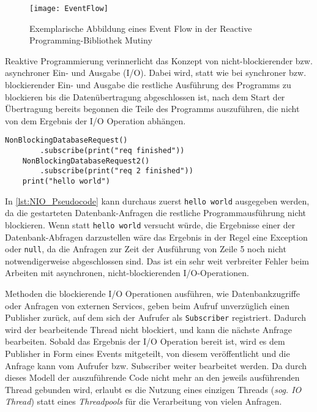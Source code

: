 \begin{figure}[h!]
	\centering
	\texttt{[image: EventFlow]}
	\caption{Exemplarische Abbildung eines Event Flow in der Reactive Programming-Bibliothek Mutiny \parencite{MutinyEventFlow}}
	\label{fig:eventflow_mutiny}
\end{figure}

Reaktive Programmierung verinnerlicht das Konzept von nicht-blockierender bzw. asynchroner Ein- und Ausgabe (I/O).
Dabei wird, statt wie bei synchroner bzw. blockierender Ein- und Ausgabe die restliche Ausführung des Programms
zu blockieren bis die Datenübertragung abgeschlossen ist, nach dem Start der Übertragung bereits begonnen die Teile des
Programms auszuführen, die nicht von dem Ergebnis der I/O Operation abhängen.

\begin{lstlisting}[caption=Pseudocode Nonblocking I/O (NIO), captionpos=b, label=lst:NIO_Pseudocode]
	NonBlockingDatabaseRequest()
		.subscribe(print("req finished"))
	NonBlockingDatabaseRequest2()
		.subscribe(print("req 2 finished"))
	print("hello world")
\end{lstlisting}
In \ref{lst:NIO_Pseudocode} kann durchaus zuerst \verb|hello world| ausgegeben werden, da die gestarteten Datenbank-Anfragen die
restliche Programmausführung nicht blockieren. Wenn statt \verb|hello world| versucht würde, die Ergebnisse einer der Datenbank-Abfragen
darzustellen wäre das Ergebnis in der Regel eine Exception oder \verb|null|, da die Anfragen zur Zeit der Ausführung von Zeile 5 noch nicht notwendigerweise
abgeschlossen sind. Das ist ein sehr weit verbreiter Fehler beim Arbeiten mit asynchronen, nicht-blockierenden I/O-Operationen.

Methoden die blockierende I/O Operationen ausführen, wie Datenbankzugriffe oder Anfragen von externen Services,
geben beim Aufruf unverzüglich einen Publisher zurück, auf dem sich der Aufrufer als \verb|Subscriber| registriert.
Dadurch wird der bearbeitende Thread nicht blockiert, und kann die nächste Anfrage bearbeiten.
Sobald das Ergebnis der I/O Operation bereit ist, wird es dem Publisher in Form eines Events mitgeteilt, von diesem veröffentlicht und die Anfrage kann
vom Aufrufer bzw. Subscriber weiter bearbeitet werden.
Da durch dieses Modell der auszuführende Code nicht mehr an den jeweils ausführenden Thread gebunden wird, erlaubt es die Nutzung eines einzigen
Threads (\textit{sog. IO Thread}) statt eines \textit{Threadpools} für die Verarbeitung von vielen Anfragen.

